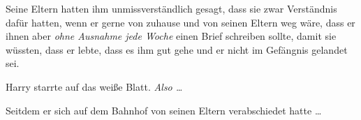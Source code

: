 Seine Eltern hatten ihm unmissverständlich gesagt, dass sie zwar Verständnis dafür hatten, wenn er gerne von zuhause und von seinen Eltern weg wäre, dass er ihnen aber \emph{ohne Ausnahme jede Woche} einen Brief schreiben sollte, damit sie wüssten, dass er lebte, dass es ihm gut gehe und er nicht im Gefängnis gelandet sei.

Harry starrte auf das weiße Blatt. \emph{Also …}

Seitdem er sich auf dem Bahnhof von seinen Eltern verabschiedet hatte …

